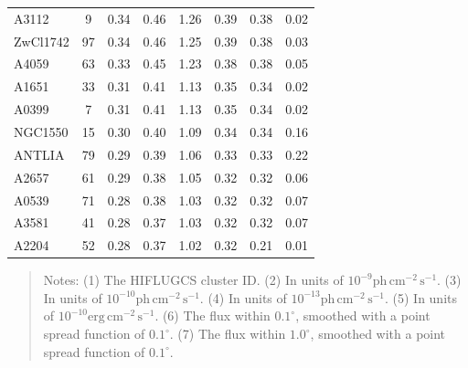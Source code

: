 \documentclass[10pt,aps,pra,reprint,amsmath,amsfonts,amssymb,showpacs,nofootinbib,floatfix]{revtex4-1}
\newcommand{\rmn}{\mathrm}
\newcommand{\vstt}{\vspace{-0.0mm}}
\begin{document}
\begin{table}
\begin{minipage}{2.0\columnwidth}
\begin{tabular}{l c c c c c c c}
A3112    &   9 &   0.34 &   0.46 &   1.26 &   0.39 &   0.38 &   0.02 \vstt \\
ZwCl1742 &  97 &   0.34 &   0.46 &   1.25 &   0.39 &   0.38 &   0.03 \vstt \\
A4059    &  63 &   0.33 &   0.45 &   1.23 &   0.38 &   0.38 &   0.05 \vstt \\
A1651    &  33 &   0.31 &   0.41 &   1.13 &   0.35 &   0.34 &   0.02 \vstt \\
A0399    &   7 &   0.31 &   0.41 &   1.13 &   0.35 &   0.34 &   0.02 \vstt \\
NGC1550  &  15 &   0.30 &   0.40 &   1.09 &   0.34 &   0.34 &   0.16 \vstt \\
ANTLIA   &  79 &   0.29 &   0.39 &   1.06 &   0.33 &   0.33 &   0.22 \vstt \\
A2657    &  61 &   0.29 &   0.38 &   1.05 &   0.32 &   0.32 &   0.06 \vstt \\
A0539    &  71 &   0.28 &   0.38 &   1.03 &   0.32 &   0.32 &   0.07 \vstt \\
A3581    &  41 &   0.28 &   0.37 &   1.03 &   0.32 &   0.32 &   0.07 \vstt \\
A2204    &  52 &   0.28 &   0.37 &   1.02 &   0.32 &   0.21 &   0.01 \vstt \\
\hline
\hline
\end{tabular}
\begin{quote}
  Notes:
   (1) The HIFLUGCS cluster ID.
   (2) In units of $10^{-9} \rmn{ph}\,\rmn{cm}^{-2}\,\rmn{s}^{-1}$.
   (3) In units of $10^{-10} \rmn{ph}\,\rmn{cm}^{-2}\,\rmn{s}^{-1}$.
   (4) In units of $10^{-13} \rmn{ph}\,\rmn{cm}^{-2}\,\rmn{s}^{-1}$.
   (5) In units of $10^{-10} \rmn{erg}\,\rmn{cm}^{-2}\,\rmn{s}^{-1}$.
   (6) The flux within $0.1^\circ$, smoothed with a point spread function of $0.1^\circ$.
   (7) The flux within $1.0^\circ$, smoothed with a point spread function of $0.1^\circ$.
 \label{tab:flux_tab_CRs}
  \end{quote}
\end{minipage}
\end{table}
\end{document}

